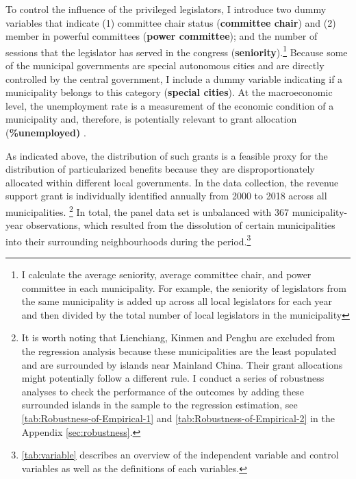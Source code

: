 To control the influence of the privileged legislators, I introduce two dummy variables that indicate (1) committee chair status (\textbf{committee chair}) and (2) member in powerful committees (\textbf{power committee}); and the number of sessions that the legislator has served in the congress (\textbf{seniority}).\footnote{I calculate the average seniority, average committee chair, and power committee in each municipality. For example, the seniority of legislators from the same municipality is added up across all local legislators for each year and then divided by the total number of local legislators in the municipality} Because some of the municipal governments are special autonomous cities and are directly controlled by the central government, I include a dummy variable indicating if a municipality belongs to this category (\textbf{special cities}). At the macroeconomic level, the unemployment rate is a measurement of the economic condition of a municipality and, therefore, is potentially relevant to grant allocation (\textbf{\%unemployed)} \citep{Adler1997}.

As indicated above, the distribution of such grants is a feasible proxy for the distribution of particularized benefits because they are disproportionately allocated within different local governments. In the data collection, the revenue support grant is individually identified annually from 2000 to 2018 across all municipalities. \footnote{It is worth noting that Lienchiang, Kinmen and Penghu are excluded from the regression analysis because these municipalities are the least populated and are surrounded by islands near Mainland China. Their grant allocations might potentially follow a different rule. I conduct a series of robustness analyses to check the performance of the outcomes by adding these surrounded islands in the sample to the regression estimation, see \autoref{tab:Robustness-of-Empirical-1} and \autoref{tab:Robustness-of-Empirical-2} in the Appendix \ref{sec:robustness}.} In total, the panel data set is unbalanced with 367 municipality-year observations, which resulted from the dissolution of certain municipalities into their surrounding neighbourhoods during the period.\footnote{\autoref{tab:variable} describes an overview of the independent variable and control variables as well as  the definitions of each variables.}

